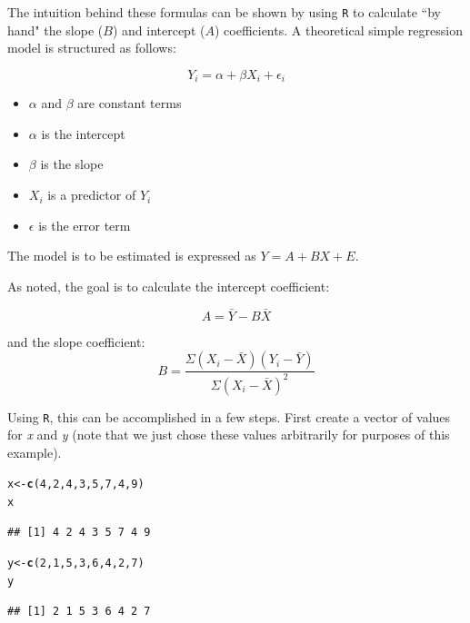 \documentclass[11pt,openany]{book}\usepackage[]{graphicx}\usepackage[]{color}
\makeatletter
\newcommand{\hlnum}[1]{\textcolor[rgb]{0.686,0.059,0.569}{#1}}%
\newcommand{\hlstd}[1]{\textcolor[rgb]{0.345,0.345,0.345}{#1}}%
\newcommand{\hlkwb}[1]{\textcolor[rgb]{0.69,0.353,0.396}{#1}}%
\newcommand{\hlkwd}[1]{\textcolor[rgb]{0.737,0.353,0.396}{\textbf{#1}}}%
\newenvironment{kframe}{%
 \def\at@end@of@kframe{}%
 \ifinner\ifhmode%
  \def\at@end@of@kframe{\end{minipage}}%
  \begin{minipage}{\columnwidth}%
 \fi\fi%
 \def\FrameCommand##1{\hskip\@totalleftmargin \hskip-\fboxsep
 \colorbox{shadecolor}{##1}\hskip-\fboxsep
     \hskip-\linewidth \hskip-\@totalleftmargin \hskip\columnwidth}%
 \MakeFramed {\advance\hsize-\width
   \@totalleftmargin\z@ \linewidth\hsize
   \@setminipage}}%
 {\par\unskip\endMakeFramed%
 \at@end@of@kframe}
\newenvironment{knitrout}{}{} %
\renewenvironment{knitrout}{\begin{singlespace}}{\end{singlespace}} %
\makeatother
\begin{document}
The intuition behind these formulas can be shown by using \texttt{R} to calculate ``by hand" the slope ($B$) and intercept ($A$) coefficients. A theoretical simple regression model is structured as
follows:  

\begin{equation*}
Y_{i} = \alpha + \beta X_{i} + \epsilon_{i} 
\end{equation*}

\begin{itemize}
\item $\alpha$ and $\beta$ are constant terms
\item $\alpha$ is the intercept
\item $\beta$ is the slope
\item $X_{i}$ is a predictor of $Y_{i}$
\item $\epsilon$ is the error term
\end{itemize}

\noindent The model is to be estimated is expressed as $Y=A+BX+E$. 

\noindent As noted, the goal is to calculate the intercept coefficient: 

\begin{equation*}
A=\bar Y-B\bar X 
\end{equation*}

\noindent and the slope
coefficient: 
\begin{equation*}
B=\frac{\Sigma(X_{i}-\bar X)(Y_{i}-\bar Y)}{\Sigma(X_{i}-\bar X)^2}
\end{equation*}

Using \texttt{R}, this can be accomplished in a few steps. First create a vector of values for \textit{x} and \textit{y} (note that we just chose these values arbitrarily for purposes of this example). 

\begin{knitrout}
\color{fgcolor}\begin{kframe}
\begin{alltt}
\hlstd{x} \hlkwb{<-} \hlkwd{c}\hlstd{(}\hlnum{4}\hlstd{,} \hlnum{2}\hlstd{,} \hlnum{4}\hlstd{,} \hlnum{3}\hlstd{,} \hlnum{5}\hlstd{,} \hlnum{7}\hlstd{,} \hlnum{4}\hlstd{,} \hlnum{9}\hlstd{)}
\hlstd{x}
\end{alltt}
\begin{verbatim}
## [1] 4 2 4 3 5 7 4 9
\end{verbatim}
\begin{alltt}
\hlstd{y} \hlkwb{<-} \hlkwd{c}\hlstd{(}\hlnum{2}\hlstd{,} \hlnum{1}\hlstd{,} \hlnum{5}\hlstd{,} \hlnum{3}\hlstd{,} \hlnum{6}\hlstd{,} \hlnum{4}\hlstd{,} \hlnum{2}\hlstd{,} \hlnum{7}\hlstd{)}
\hlstd{y}
\end{alltt}
\begin{verbatim}
## [1] 2 1 5 3 6 4 2 7
\end{verbatim}
\end{kframe}
\end{knitrout}
\end{document}
